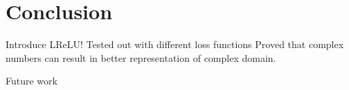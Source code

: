 \chapter{Conclusion} \label{chap:experiments}


Introduce LReLU! 
Tested out with different loss functions
Proved that complex numbers can result in better representation of complex domain. 

Future work